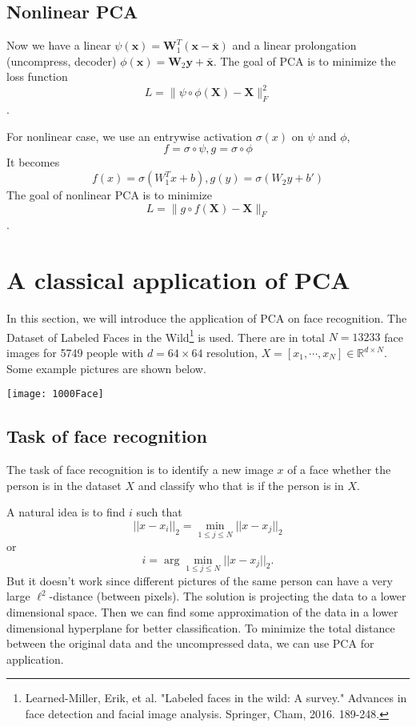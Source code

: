 \subsection{Nonlinear PCA}
	
	Now we have a linear  $\psi(\mathbf x)=\mathbf W_1^T(\mathbf x-\bar{\mathbf x})$ and a linear prolongation (uncompress, decoder) $\phi(\mathbf x)=\mathbf W_2\mathbf y+\bar{\mathbf x}$. The goal of PCA is to minimize the loss function
	$$L=\|\psi\circ \phi(\mathbf X)-\mathbf X \|_F^2$$.
	
	For nonlinear case, we use an entrywise activation $\sigma(x)$ on $\psi$ and $\phi$,
	$$
	f=\sigma\circ \psi, g=\sigma\circ\phi
	$$
	It becomes $$f(x)=\sigma(W_1^T x +b), g(y)=\sigma (W_2 y + b')$$
	The goal of nonlinear PCA is to minimize 
	$$L=\|g\circ f(\mathbf X)-\mathbf X \|_F$$.
	

\section{A classical application of PCA}
In this section, we will introduce the application of PCA on face recognition. The Dataset of Labeled Faces in the Wild\footnote{Learned-Miller, Erik, et al. "Labeled faces in the wild: A survey." Advances in face detection and facial image analysis. Springer, Cham, 2016. 189-248.} is used. 
There are  in total $N=13233$ face images for 5749 people  with $d=64\times 64$ resolution, $X = [x_1, \cdots, x_{N}]\in \mathbb{R}^{d\times N}$.
Some example pictures are shown below. 
\begin{center}
\texttt{[image: 1000Face]} 
\end{center}


\subsection{Task of face recognition}
The task of face recognition is to identify a new image $x$ of a face whether the person is in the dataset $X$ and classify who that is if the person is in $X$. 

A natural idea is to find $i$ such that $$||x-x_i||_2=\min_{1\le j\le N} ||x-x_j||_2$$ or $$i=\arg\min_{1\le j\le N} ||x-x_j||_2.$$ But it doesn't work since different pictures of the same person can have a very large $\ell^2$-distance (between pixels). The solution is projecting the data to a lower dimensional space. 
Then we can find some approximation of the data in a lower dimensional hyperplane for better classification.  To minimize the total distance between the original data and the uncompressed data, we can use PCA for application. 

